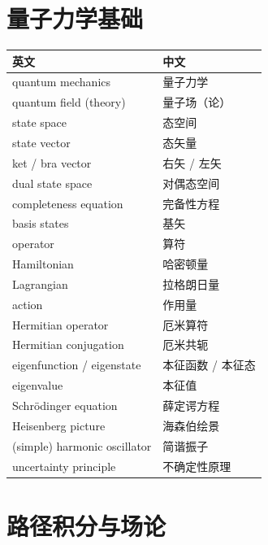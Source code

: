 \section{量子力学基础}

\begin{center}
\begin{tabular}{@{}L{6.4cm}L{7.4cm}@{}}
\toprule
英文 & 中文 \\
\midrule
quantum mechanics & 量子力学 \\
quantum field (theory) & 量子场（论） \\
state space & 态空间 \\
state vector & 态矢量 \\
ket / bra vector & 右矢 / 左矢 \\
dual state space & 对偶态空间 \\
completeness equation & 完备性方程 \\
basis states & 基矢 \\
operator & 算符 \\
Hamiltonian & 哈密顿量 \\
Lagrangian & 拉格朗日量 \\
action & 作用量 \\
Hermitian operator & 厄米算符 \\
Hermitian conjugation & 厄米共轭 \\
eigenfunction / eigenstate & 本征函数 / 本征态 \\
eigenvalue & 本征值 \\
Schr\"{o}dinger equation & 薛定谔方程 \\
Heisenberg picture & 海森伯绘景 \\
(simple) harmonic oscillator & 简谐振子 \\
uncertainty principle & 不确定性原理 \\
\bottomrule
\end{tabular}
\end{center}

\section{路径积分与场论}

